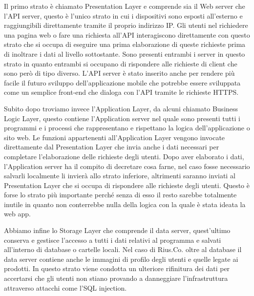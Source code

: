 Il primo strato è chiamato Presentation Layer e comprende sia il Web server che l'API server, questo è l'unico strato in cui i dispositivi sono esposti all'esterno e raggiungibili direttamente tramite il proprio indirizzo IP. Gli utenti nel richiedere una pagina web o fare una richiesta all'API interagiscono direttamente con questo strato che si occupa di eseguire una prima elaborazione di queste richieste prima di inoltrare i dati al livello sottostante. Sono presenti entrambi i server in questo strato in quanto entrambi si occupano di rispondere alle richieste di client che sono però di tipo diverso. L'API server è stato inserito anche per rendere più facile il futuro sviluppo dell'applicazione mobile che potrebbe essere sviluppata come un semplice front-end che dialoga con l'API tramite le richieste HTTPS. 
\medskip

Subito dopo troviamo invece l'Application Layer, da alcuni chiamato Business Logic Layer, questo contiene l'Application server nel quale sono presenti tutti i programmi e i processi che rappresentano e rispettano la logica dell'applicazione o sito web. Le funzioni appartenenti all'Application Layer vengono invocate direttamente dal Presentation Layer che invia anche i dati necessari per completare l'elaborazione delle richieste degli utenti. Dopo aver elaborato i dati, l'Application server ha il compito di decretare cosa farne, nel caso fosse necessario salvarli localmente li invierà allo strato inferiore, altrimenti saranno inviati al Presentation Layer che si occupa di rispondere alle richieste degli utenti. Questo è forse lo strato più importante perché senza di esso il resto sarebbe totalmente inutile in quanto non conterrebbe nulla della logica con la quale è stata ideata la web app. 
\medskip

Abbiamo infine lo Storage Layer che comprende il data server, quest'ultimo conserva e gestisce l'accesso a tutti i dati relativi al programma e salvati all'interno di database o cartelle locali. Nel caso di Rius.Co. oltre al database il data server contiene anche le immagini di profilo degli utenti e quelle legate ai prodotti. In questo strato viene condotta un ulteriore rifinitura dei dati per accertarsi che gli utenti non stiano provando a danneggiare l'infrastruttura attraverso attacchi come l'SQL injection. 

